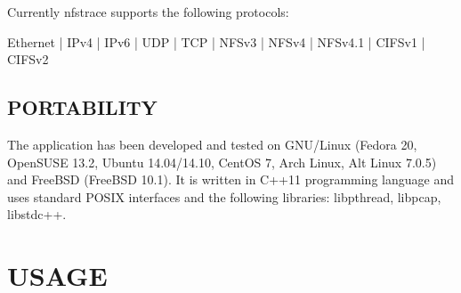 \documentclass{article}
\newcommand*{\textfile}[1]{\textsf{#1}}
\newcommand*{\textprog}[1]{\textfile{#1}}
\begin{document}
Currently \textprog{nfstrace} supports the following protocols:
\begin{CodeListing}
Ethernet | IPv4 | IPv6 | UDP | TCP |  NFSv3 | NFSv4 | NFSv4.1 | CIFSv1 | CIFSv2
\end{CodeListing}

\subsection{PORTABILITY}

The application has been developed and tested on GNU/Linux (Fedora 20, OpenSUSE
13.2, Ubuntu 14.04/14.10, CentOS 7, Arch Linux, Alt Linux 7.0.5) and FreeBSD
(FreeBSD 10.1). It is written in C++11 programming language and uses standard
\gls{POSIX} interfaces and the following libraries: libpthread, libpcap,
libstdc++.

\clearpage

\section{USAGE}
\end{document}
